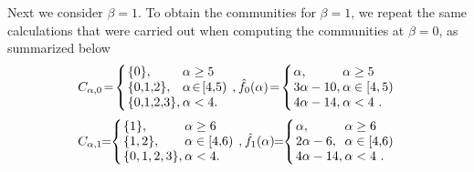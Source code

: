 Next we consider $\beta = 1$.  
To obtain the communities for $\beta = 1$, we repeat the same calculations that were carried out
when computing the communities at $\beta = 0$, as summarized below 
\begin{align*}
\arraycolsep=1pt\def\arraystretch{1.0}
	\begin{array}{lll}
	C_{\alpha,0} \! = \! \left\{
		\begin{array}{ll}
			\Set{0}, & \alpha \geq  5 \\
			\Set{0,\! 1,\!2}, & \alpha \!\in\! [4,\!5) \\
			\Set{0,\!1,\!2,\!3}, & \alpha < 4 .
		\end{array}
		\right.
		& , &
	\hat{f}_{0}(\alpha) \!= \! \left\{
		\begin{array}{ll}
			 \alpha, &  \alpha \geq  5 \\
			3\alpha -10, & \alpha \in [4,5) \\
			4\alpha -14, & \alpha < 4 \ .
		\end{array}
		\right.
	\end{array}
\end{align*}
%
\begin{align*}
\arraycolsep=1pt\def\arraystretch{1.0}
\begin{array}{lll}
	C_{\alpha,1} \!\! = \!\! \left\{
	\begin{array}{ll}
		\Set{1},   &   \alpha \geq  6 \\
		\Set{1,2}, &   \alpha \in [4,\!6) \\
		\Set{0,1,2,3}, & \alpha < 4 .
	\end{array}
	\right.
	& , &
	\hat{f}_{1}(\alpha) \!\!= \!\! \left\{
	\begin{array}{ll}
		 \alpha, 	 & \alpha \geq  6 \\
		2\alpha -6,  & \alpha \in [4,\!6) \\
		4\alpha -14, & \alpha < 4 \ .
	\end{array}
	\right.
\end{array}
\end{align*}

%

